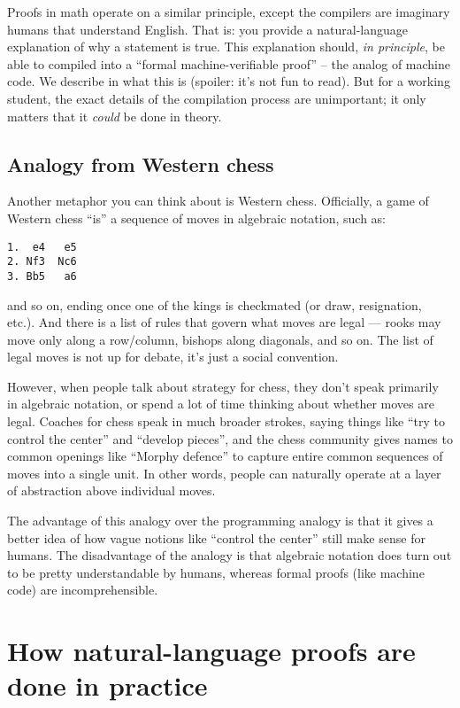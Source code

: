 \documentclass[11pt]{scrartcl}
\begin{document}
\alert{Proofs in math operate on a similar principle,
except the compilers are imaginary humans that understand English.}
That is: you provide a natural-language explanation of why a statement is true.
This explanation should, \emph{in principle},
be able to compiled into a ``formal machine-verifiable proof''
-- the analog of machine code.
We describe in  what this is (spoiler: it's not fun to read).
But for a working student, the exact details of the compilation process
are unimportant; it only matters that it \emph{could} be done in theory.

\subsection{Analogy from Western chess}
Another metaphor you can think about is Western chess.
Officially, a game of Western chess ``is''
a sequence of moves in algebraic notation, such as:
\begin{lstlisting}[basicstyle=\normalsize\ttfamily,numbers=none]
1.  e4   e5
2. Nf3  Nc6
3. Bb5   a6
\end{lstlisting}
and so on,
ending once one of the kings is checkmated (or draw, resignation, etc.).
And there is a list of rules that govern what moves are legal --- rooks
may move only along a row/column, bishops along diagonals, and so on.
The list of legal moves is not up for debate, it's just a social convention.

However, when people talk about strategy for chess,
they don't speak primarily in algebraic notation,
or spend a lot of time thinking about whether moves are legal.
Coaches for chess speak in much broader strokes,
saying things like ``try to control the center'' and ``develop pieces'',
and the chess community gives names to common openings like ``Morphy defence''
to capture entire common sequences of moves into a single unit.
In other words, people can naturally operate
at a layer of abstraction above individual moves.

The advantage of this analogy over the programming analogy is that
it gives a better idea of how vague notions
like ``control the center'' still make sense for humans.
The disadvantage of the analogy is that algebraic notation does
turn out to be pretty understandable by humans,
whereas formal proofs (like machine code) are incomprehensible.

\section{How natural-language proofs are done in practice}
\label{sec:practice}
\end{document}
